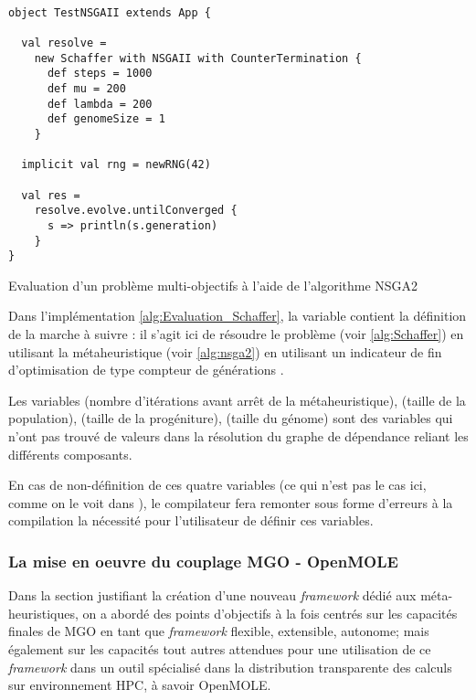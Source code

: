 \begin{listing}[H]

\begin{verbatim}

object TestNSGAII extends App {

  val resolve =
    new Schaffer with NSGAII with CounterTermination {
      def steps = 1000
      def mu = 200
      def lambda = 200
      def genomeSize = 1
    }

  implicit val rng = newRNG(42)

  val res =
    resolve.evolve.untilConverged {
      s => println(s.generation)
    }
}

\end{verbatim}
\caption{Evaluation d'un problème multi-objectifs à l'aide de l'algorithme NSGA2}
\label{alg:Evaluation_Schaffer}
\end{listing}

Dans l'implémentation \ref{alg:Evaluation_Schaffer}, la variable  contient la définition de la marche à suivre : il s'agit ici de résoudre le problème  (voir \ref{alg:Schaffer}) en utilisant la métaheuristique  (voir \ref{alg:nsga2}) en utilisant un indicateur de fin d'optimisation de type compteur de générations .

Les variables  (nombre d'itérations avant arrêt de la métaheuristique),  (taille de la population),  (taille de la progéniture),  (taille du génome) sont des variables qui n'ont pas trouvé de valeurs dans la résolution du graphe de dépendance reliant les différents composants.

En cas de non-définition de ces quatre variables (ce qui n'est pas le cas ici, comme on le voit dans ), le compilateur fera remonter sous forme d'erreurs à la compilation la nécessité pour l'utilisateur de définir ces variables.

\subsubsection{La mise en oeuvre du couplage MGO - OpenMOLE }

Dans la section justifiant la création d'une nouveau \textit{framework} dédié aux méta-heuristiques, on a abordé des points d'objectifs à la fois centrés sur les capacités finales de MGO en tant que \textit{framework} flexible, extensible, autonome; mais également sur les capacités tout autres attendues pour une utilisation de ce \textit{framework} dans un outil spécialisé dans la distribution transparente des calculs sur environnement HPC, à savoir OpenMOLE.

